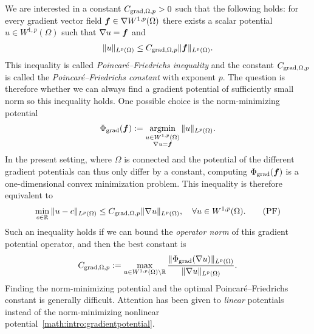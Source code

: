 \documentclass[10pt,a4paper]{article}
\begin{document}
We are interested in a constant $C_{\operatorname{grad},\Omega,p} > 0$ such that the following holds:
for every gradient vector field $\bm{f} \in \nabla W^{1,p}(\Omega)$ 
there exists a scalar potential $u \in W^{1,p}(\Omega)$
such that $\nabla u = \bm{f}$ and 
\begin{align}\label{math:intro:inequalitypf:gradient} 
    \| u \|_{L^{p}(\Omega)}
    \leq 
    C_{\operatorname{grad},\Omega,p} 
    \| \bm{f} \|_{L^{p}(\Omega)}
    .
\end{align}
This inequality is called \emph{Poincar\'e--Friedrichs inequality} and the constant $C_{\operatorname{grad},\Omega,p}$ is called the \emph{Poincar\'e--Friedrichs constant} with exponent $p$. 
The question is therefore whether we can always find a gradient potential of sufficiently small norm so this inequality holds. 
One possible choice is the norm-minimizing potential 
\begin{align}\label{math:intro:gradientpotential}
    \Phi_{\operatorname{grad}}( \bm{f} ) := \operatorname*{{\rm argmin}}\limits_{ \substack{ u \in W^{1,p}(\Omega) \\ \nabla u = \bm{f} } } \| u \|_{L^{p}(\Omega)}.
\end{align}
In the present setting, where $\Omega$ is connected and the potential of the different gradient potentials can thus only differ by a constant, computing $\Phi_{\operatorname{grad}}( \bm{f} )$ is a one-dimensional convex minimization problem. 
This inequality is therefore equivalent to  
\begin{align}\label{math:intro:poincarefriedrichs:grad}
    \min\limits_{c\in{\mathbb R}}
    \| u - c \|_{L^{p}(\Omega)}
    \leq 
    C_{\operatorname{grad},\Omega,p} \| \nabla u \|_{L^{p}(\Omega)},
    \quad 
    \forall
    u \in W^{1,p}(\Omega) 
    .\tag{PF} 
\end{align}
Such an inequality holds if we can bound the \emph{operator norm} of this gradient potential operator, and then the best constant is  
\begin{align}\label{math:intro:gradient:potentialnorm}
    C_{\operatorname{grad},\Omega,p} := \max\limits_{ u \in W^{1,p}(\Omega) \setminus {\mathbb R} } 
    \frac{ \| \Phi_{\operatorname{grad}}(\nabla u) \|_{L^{p}(\Omega)} }{ \| \nabla u \|_{L^{p}(\Omega)} }.
\end{align}
Finding the norm-minimizing potential and the optimal Poincar\'e--Friedrichs constant is generally difficult. 
Attention has been given to \emph{linear} potentials instead of the norm-minimizing nonlinear potential~\eqref{math:intro:gradientpotential}. 
\end{document}
